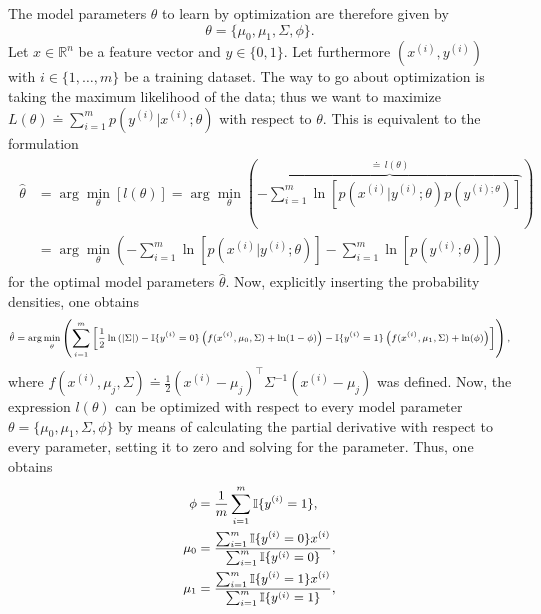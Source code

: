 \documentclass[a4paper,11pt]{article}
\numberwithin{equation}{section}
\begin{document}
{The model parameters $\theta$ to learn by optimization are therefore given by \begin{equation}
	\theta= \{\mu_0, \mu_1, \Sigma, \phi\}.
\end{equation} Let $x \in \mathbb{R}^n$ be a feature vector and $y \in \{0,1\}$. Let furthermore $(x^{(i)}, y^{(i)})$ with $i \in \{1,\dots,m\}$ be a training dataset. The way to go about optimization is taking the maximum likelihood of the data; thus we want to maximize $L(\theta) \doteq \sum_{i=1}^m p(y^{(i)}|x^{(i)};\theta)$ with respect to $\theta$. This is equivalent to the formulation \begin{align} \begin{aligned}
\hat{\theta} &= \arg\min_\theta\left[l(\theta)\right] = \arg\min_\theta\left(\overbrace{-\sum_{i=1}^{m}\ln\left[p(x^{(i)}|y^{(i)};\theta)p(y^{(i);\theta})\right]}^{\doteq\,l(\theta)}\right) \\ &= \arg\min_\theta\left(-\sum_{i=1}^{m}\ln\left[p(x^{(i)}|y^{(i)};\theta)\right] - \sum_{i=1}^{m}\ln\left[p(y^{(i)};\theta)\right]\right)
\end{aligned}\end{align} for the optimal model parameters $\hat{\theta}$. Now, explicitly inserting the probability densities, one obtains \begin{align}\scriptsize
\begin{aligned}
	\hat{\theta} = \arg\min_\theta\left(\sum_{i=1}^{m}\left[\frac{1}{2}\ln\left(|\Sigma|\right) - \mathbb{I}\{y^{(i)}=0\}\left(f(x^{(i)}, \mu_0, \Sigma)+\ln(1-\phi)\right) - \mathbb{I}\{y^{(i)}=1\}\left(f(x^{(i)}, \mu_1, \Sigma)+\ln(\phi)\right)\right]\right),
\end{aligned}
\end{align} where $f(x^{(i)}, \mu_j, \Sigma) \doteq \frac{1}{2}(x^{(i)}-\mu_j)^\top \Sigma^{-1}(x^{(i)}-\mu_j)$ was defined. Now, the expression $l(\theta)$ can be optimized with respect to every model parameter $\theta= \{\mu_0,\mu_1,\Sigma, \phi\}$ by means of calculating the partial derivative with respect to every parameter, setting it to zero and solving for the parameter. Thus, one obtains \begin{align}\small
\begin{aligned}
	\phi &= \frac{1}{m}\sum_{i=1}^m\mathbb{I}\{y^{(i)}=1\}, \\
	\mu_0 &= \frac{\sum_{i=1}^{m}\mathbb{I}\{y^{(i)}=0\}x^{(i)}}{\sum_{i=1}^{m}\mathbb{I}\{y^{(i)}=0\}}, \\
	\mu_1 &= \frac{\sum_{i=1}^{m}\mathbb{I}\{y^{(i)}=1\}x^{(i)}}{\sum_{i=1}^{m}\mathbb{I}\{y^{(i)}=1\}}, \\

\end{aligned}
\end{align}}
\end{document}
